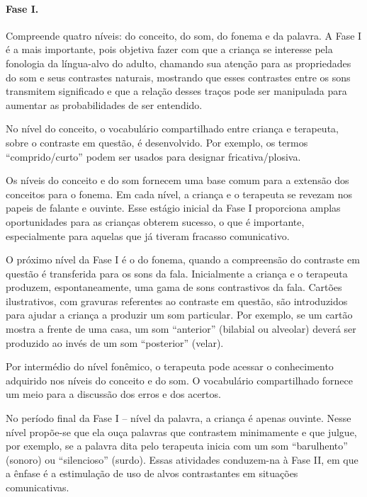 \documentclass[output=paper,colorlinks,citecolor=brown,booklanguage=portuguese]{langscibook}
\begin{document}
\paragraph*{Fase I.} Compreende quatro níveis: do conceito, do som, do fonema e da palavra. A Fase I é a mais importante, pois objetiva fazer com que a criança se interesse pela fonologia da língua-alvo do adulto, chamando sua atenção para as propriedades do som e seus contrastes naturais, mostrando que esses contrastes entre os sons transmitem significado e que a relação desses traços pode ser manipulada para aumentar as probabilidades de ser entendido.

No nível do conceito, o vocabulário compartilhado entre criança e terapeuta, sobre o contraste em questão, é desenvolvido. Por exemplo, os termos “comprido/curto” podem ser usados para designar fricativa/plosiva.

Os níveis do conceito e do som fornecem uma base comum para a extensão dos conceitos para o fonema.  Em cada nível, a criança e o terapeuta se revezam nos papeis de falante e ouvinte. Esse estágio inicial da Fase I proporciona amplas oportunidades para as crianças obterem sucesso, o que é importante, especialmente para aquelas que já tiveram fracasso comunicativo.

O próximo nível da Fase I é o do fonema, quando a compreensão do contraste em questão é transferida para os sons da fala. Inicialmente a criança e o terapeuta produzem, espontaneamente, uma gama de sons contrastivos da fala. Cartões ilustrativos, com gravuras referentes ao contraste em questão, são introduzidos para ajudar a criança a produzir um som particular. Por exemplo, se um cartão mostra a frente de uma casa, um som “anterior” (bilabial ou alveolar) deverá ser produzido ao invés de um som “posterior” (velar).

Por intermédio do nível fonêmico, o terapeuta pode acessar o conhecimento adquirido nos níveis do conceito e do som. O vocabulário compartilhado fornece um meio para a discussão dos erros e dos acertos.

No período final da Fase I -- nível da palavra, a criança é apenas ouvinte. Nesse nível propõe-se que ela ouça palavras que contrastem minimamente e que julgue, por exemplo, se a palavra dita pelo terapeuta inicia com um som “barulhento” (sonoro) ou “silencioso” (surdo). Essas atividades conduzem-na à Fase II, em que a ênfase é a estimulação de uso de alvos contrastantes em situações comunicativas.
\end{document}
